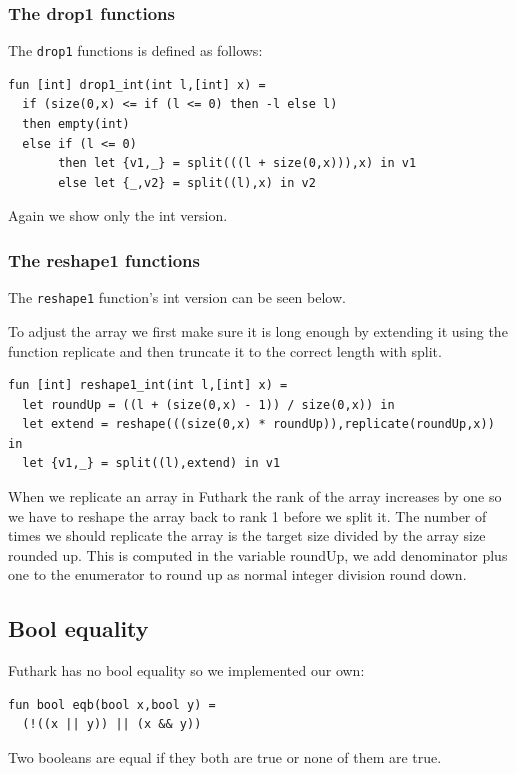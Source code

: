 \documentclass[11pt]{article}
\begin{document}
\subsubsection{The drop1 functions}
The {\tt drop1} functions is defined as follows: 
\begin{lstlisting}[language=Futhark]
fun [int] drop1_int(int l,[int] x) =
  if (size(0,x) <= if (l <= 0) then -l else l)
  then empty(int)
  else if (l <= 0)
       then let {v1,_} = split(((l + size(0,x))),x) in v1
       else let {_,v2} = split((l),x) in v2
\end{lstlisting}
Again we show only the int version. 

\subsubsection{The reshape1 functions}
The {\tt reshape1} function's int version can be seen below.

To adjust the array we first make sure it is long enough by extending it using the function replicate and then
truncate it to the correct length with split.

\begin{lstlisting}[language=Futhark]
fun [int] reshape1_int(int l,[int] x) =
  let roundUp = ((l + (size(0,x) - 1)) / size(0,x)) in
  let extend = reshape(((size(0,x) * roundUp)),replicate(roundUp,x)) in
  let {v1,_} = split((l),extend) in v1
\end{lstlisting}

When we replicate an array in Futhark the rank of the array increases by one so we have to reshape the array back to rank 1 before we split it.
The number of times we should replicate the array is the target size divided by the array size rounded up.
This is computed in the variable roundUp, we add denominator plus one to the enumerator to round up as normal integer division round down.

\subsection{Bool equality}

Futhark has no bool equality so we implemented our own:

\begin{lstlisting}[language=Futhark]
fun bool eqb(bool x,bool y) =
  (!((x || y)) || (x && y))
\end{lstlisting}

Two booleans are equal if they both are true or none of them are true.
\end{document}
